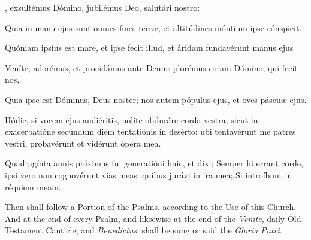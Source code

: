 {, exsultémus Dómino, jubilémus Deo, salutári nostro:\par
{}
Quia in manu ejus sunt omnes fines terr{\ae}, et altitúdines móntium ipse cónspicit.\par
Quóniam ipsíus est mare, et ipse fecit illud, et áridam fundavérunt manus ejus\par
Veníte, adorémus, et procidámus ante Deum: plorémus coram Dómino, qui fecit nos,\par
Quia ipse est Dóminus, Deus noster; nos autem pópulus ejus, et oves páscu{\ae} ejus.\par
Hódie, si vocem ejus audiéritis, nolíte obduráre corda vestra, sicut in exacerbatióne secúndum diem tentatiónis in desérto: ubi tentavérunt me patres vestri, probavérunt et vidérunt ópera mea.
\par
Quadragínta annis próximus fui generatióni huic, et dixi; Semper hi errant corde, ipsi vero non cognovérunt vias meas: quibus jurávi in ira mea; Si introíbunt in réquiem meam.}

\begin{rubric}
    Then shall follow a Portion of the Psalms, according to the Use of this Church. And at the end of every Psalm, and liksewise at the end of the \emph{Venite}, daily Old Testament Canticle, and \emph{Benedictus}, shall be sung or said the \emph{Gloria Patri}.
\end{rubric}

